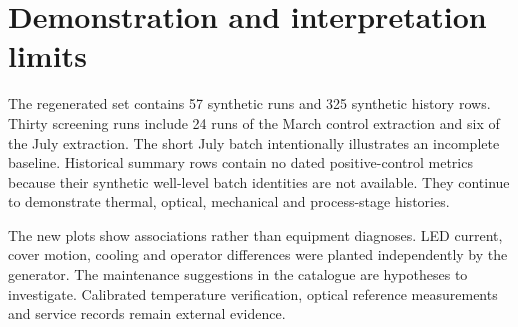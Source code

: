 \section{Demonstration and interpretation limits}
The regenerated set contains 57 synthetic runs and 325 synthetic history rows. Thirty screening runs include 24 runs of
the March control extraction and six of the July extraction. The short July batch intentionally illustrates an incomplete
baseline. Historical summary rows contain no dated positive-control metrics because their synthetic well-level batch identities
are not available. They continue to demonstrate thermal, optical, mechanical and process-stage histories.

The new plots show associations rather than equipment diagnoses. LED current, cover motion, cooling and operator differences
were planted independently by the generator. The maintenance suggestions in the catalogue are hypotheses to investigate.
Calibrated temperature verification, optical reference measurements and service records remain external evidence.


